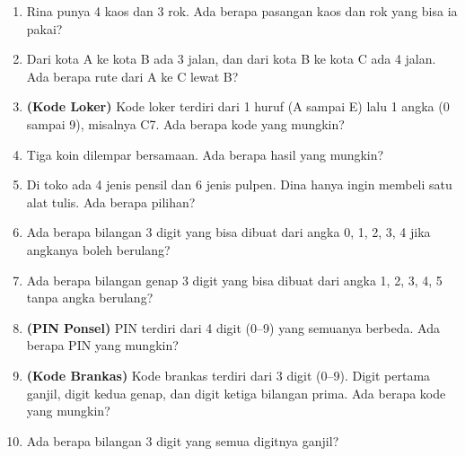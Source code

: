 \documentclass[11pt,a4paper]{article}
\begin{document}
\begin{enumerate}
  \item Rina punya 4 kaos dan 3 rok. Ada berapa pasangan kaos dan rok yang bisa ia pakai?
  \item Dari kota A ke kota B ada 3 jalan, dan dari kota B ke kota C ada 4 jalan. Ada berapa
        rute dari A ke C lewat B?
  \item \textbf{(Kode Loker)} Kode loker terdiri dari 1 huruf (A sampai E) lalu 1 angka
        (0 sampai 9), misalnya C7. Ada berapa kode yang mungkin?
  \item Tiga koin dilempar bersamaan. Ada berapa hasil yang mungkin?
  \item Di toko ada 4 jenis pensil dan 6 jenis pulpen. Dina hanya ingin membeli satu alat tulis.
        Ada berapa pilihan?
\end{enumerate}

\begin{enumerate}
  \setcounter{enumi}{5}
  \item Ada berapa bilangan 3 digit yang bisa dibuat dari angka 0, 1, 2, 3, 4 jika angkanya
        boleh berulang?
  \item Ada berapa bilangan genap 3 digit yang bisa dibuat dari angka 1, 2, 3, 4, 5 tanpa
        angka berulang?
  \item \textbf{(PIN Ponsel)} PIN terdiri dari 4 digit (0--9) yang semuanya berbeda.
        Ada berapa PIN yang mungkin?
  \item \textbf{(Kode Brankas)} Kode brankas terdiri dari 3 digit (0--9). Digit pertama ganjil,
        digit kedua genap, dan digit ketiga bilangan prima. Ada berapa kode yang mungkin?
  \item Ada berapa bilangan 3 digit yang semua digitnya ganjil?
\end{enumerate}
\end{document}
